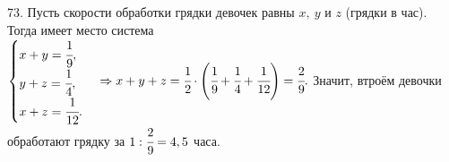 73. Пусть скорости обработки грядки девочек равны $x,\ y$ и $z$ (грядки в час). Тогда имеет место система $\begin{cases} x+y=\cfrac{1}{9},\\ y+z=\cfrac{1}{4},\\ x+z=\cfrac{1}{12}.\end{cases}\Rightarrow x+y+z=\cfrac{1}{2}\cdot\left(\cfrac{1}{9}+\cfrac{1}{4}+\cfrac{1}{12}\right)=\cfrac{2}{9}.$ Значит, втроём девочки обработают грядку за $1:\cfrac{2}{9}=4,5$ часа.\\
